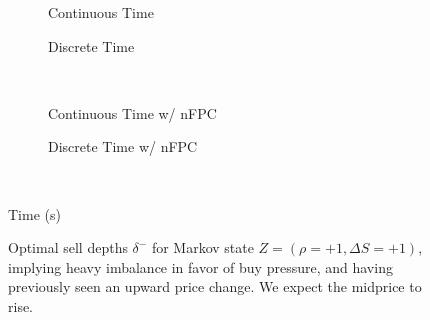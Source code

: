 \begin{figure}
\centering
\begin{subfigure}{.45\linewidth}
  \centering
  \setlength\figureheight{\linewidth} 
  \setlength\figurewidth{\linewidth}
  
  \caption{Continuous Time}
\end{subfigure}%
\hfill%
\begin{subfigure}{.45\linewidth}
  \centering
  \setlength\figureheight{\linewidth} 
  \setlength\figurewidth{\linewidth}
   
  \caption{Discrete Time}
\end{subfigure}\\
\vspace{1cm}
\begin{subfigure}{.45\linewidth}
  \centering
  \setlength\figureheight{\linewidth} 
  \setlength\figurewidth{\linewidth}
   
  \caption{Continuous Time w/ nFPC}
\end{subfigure}%
\hfill%
\begin{subfigure}{.45\linewidth}
  \centering
  \setlength\figureheight{\linewidth} 
  \setlength\figurewidth{\linewidth}
   
  \caption{Discrete Time w/ nFPC}
\end{subfigure}\\

\leavevmode{}\hspace{0pt plus 1filll}\null

Time (s)

\vspace{1cm}
\begin{subfigure}{\linewidth}
  \centering
   
\end{subfigure}%
  \caption{Optimal sell depths $\delta^{-}$ for Markov state $Z=(\rho = +1, \Delta S = +1)$, implying heavy imbalance in favor of buy pressure, and having previously seen an upward price change. We expect the midprice to rise.}
  \label{fig:comp_dm_z15}
\end{figure}

